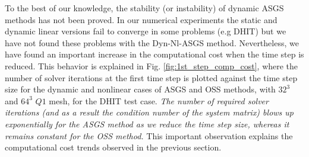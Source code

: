 To the best of our knowledge, the stability (or instability) of dynamic ASGS methods has not been proved. In our numerical experiments the static and dynamic linear versions fail to converge in some problems (e.g DHIT) but we have not found these problems with the Dyn-Nl-ASGS method. Nevertheless, we have found an important increase in the computational cost when the time step is reduced. 
This behavior is explained in Fig. \ref{fig:1st_step_comp_cost}, where the number of solver iterations at the first time step is plotted against the time step size for the dynamic and nonlinear cases of ASGS and OSS methods, with $32^3$ and $64^3$ $Q1$ mesh, for the DHIT test case. \emph{The number of required solver iterations (and as a result the condition number of the system matrix) blows up exponentially for the ASGS method as we reduce the time step size, whereas it remains constant for the OSS method.} This important observation explains the computational cost trends observed in the previous section.



%
